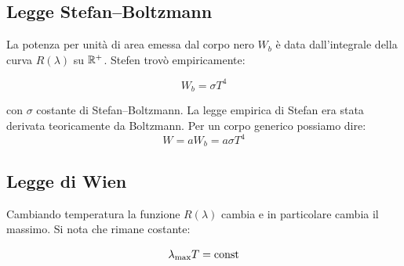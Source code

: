 \subsection{Legge Stefan--Boltzmann}
La potenza per unità di area emessa dal corpo nero $W_b$ è data dall'integrale della curva $R(\lambda)$ su $\mathbb{R}^+$. Stefen trovò empiricamente:
\begin{legge}
	\begin{equation}
		W_b=\sigma T^4
	\end{equation}
\end{legge}
con $\sigma$ costante di Stefan--Boltzmann. La legge empirica di Stefan era stata derivata teoricamente da Boltzmann. Per un corpo generico possiamo dire:
\begin{equation}
	W=aW_b=a\sigma T^4
\end{equation}
\subsection{Legge di Wien}
Cambiando temperatura la funzione $R(\lambda)$ cambia e in particolare cambia il massimo. Si nota che rimane costante:
\begin{legge}
	\begin{equation}
		\lambda_\text{max}T = \text{const}
	\end{equation}
\end{legge}
